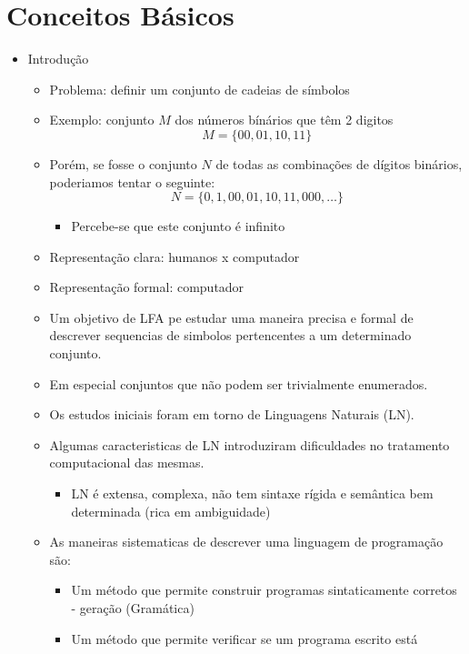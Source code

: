 \documentclass[12pt]{article}
\begin{document}
\section{Conceitos Básicos}
\begin{itemize}
    \item Introdução
    \begin{itemize}
        \item Problema: definir um conjunto de cadeias de símbolos
        \item Exemplo: conjunto \(M\) dos números bínários que têm 2 digitos
        \[ M=\{00,01,10,11\} \]
        \item Porém, se fosse o conjunto \(N\) de todas as combinações de 
        dígitos binários, poderiamos tentar o seguinte:
        \[ N=\{0,1,00,01,10,11,000,\dots\} \]
        \begin{itemize}
            \item Percebe-se que este conjunto é infinito
        \end{itemize}
        \item Representação clara: humanos x computador
        \item Representação formal: computador
        \item Um objetivo de LFA pe estudar uma maneira precisa e formal de 
        descrever sequencias de simbolos pertencentes a um determinado conjunto.
        \item Em especial conjuntos que não podem ser trivialmente enumerados.
        \item Os estudos iniciais foram em torno de Linguagens Naturais (LN).
        \item Algumas caracteristicas de LN introduziram dificuldades no 
        tratamento computacional das mesmas.
        \begin{itemize}
            \item LN é extensa, complexa, não tem sintaxe rígida e semântica 
            bem determinada (rica em ambiguidade)
        \end{itemize}
        \item As maneiras sistematicas de descrever uma linguagem de programação 
        são:
        \begin{itemize}
            \item Um método que permite construir programas sintaticamente 
            corretos - geração (Gramática)
            \item Um método que permite verificar se um programa escrito está 

\end{itemize}
\end{itemize}
\end{itemize}
\end{document}
